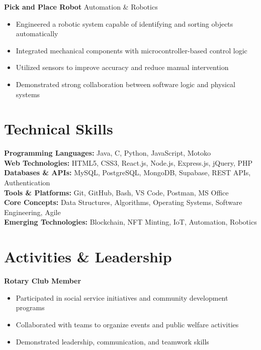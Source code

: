 \documentclass[11pt]{article}
\begin{document}
\textbf{Pick and Place Robot} \hfill Automation \& Robotics
\begin{itemize}[leftmargin=*,noitemsep]
\item Engineered a robotic system capable of identifying and sorting objects automatically
\item Integrated mechanical components with microcontroller-based control logic
\item Utilized sensors to improve accuracy and reduce manual intervention
\item Demonstrated strong collaboration between software logic and physical systems
\end{itemize}

\section*{Technical Skills}
\textbf{Programming Languages:} Java, C, Python, JavaScript, Motoko\\
\textbf{Web Technologies:} HTML5, CSS3, React.js, Node.js, Express.js, jQuery, PHP\\
\textbf{Databases \& APIs:} MySQL, PostgreSQL, MongoDB, Supabase, REST APIs, Authentication\\
\textbf{Tools \& Platforms:} Git, GitHub, Bash, VS Code, Postman, MS Office\\
\textbf{Core Concepts:} Data Structures, Algorithms, Operating Systems, Software Engineering, Agile\\
\textbf{Emerging Technologies:} Blockchain, NFT Minting, IoT, Automation, Robotics

\section*{Activities \& Leadership}
\textbf{Rotary Club Member}
\begin{itemize}[leftmargin=*,noitemsep]
\item Participated in social service initiatives and community development programs
\item Collaborated with teams to organize events and public welfare activities
\item Demonstrated leadership, communication, and teamwork skills
\end{itemize}
\end{document}
